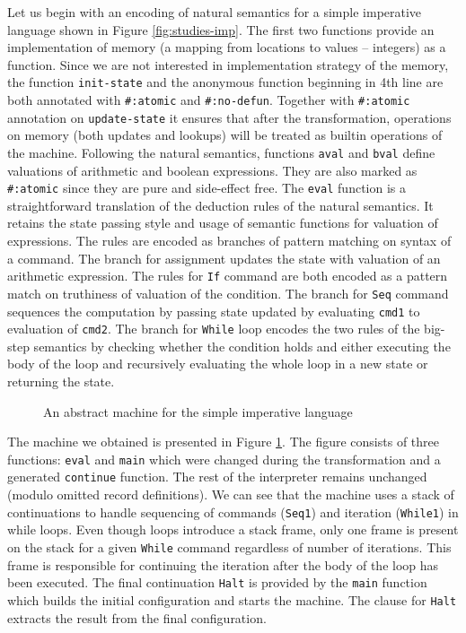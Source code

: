 Let us begin with an encoding of natural semantics for a simple imperative language shown in Figure \ref{fig:studies-imp}.
The first two functions provide an implementation of memory (a mapping from locations to values -- integers) as a function.
Since we are not interested in implementation strategy of the memory, the function \lstinline!init-state! and the anonymous function beginning in 4th line are both annotated with \lstinline!#:atomic! and \lstinline!#:no-defun!.
Together with \lstinline!#:atomic! annotation on \lstinline!update-state! it ensures that after the transformation, operations on memory (both updates and lookups) will be treated as builtin operations of the machine.
Following the natural semantics, functions \lstinline!aval! and \lstinline!bval! define valuations of arithmetic and boolean expressions.
They are also marked as \lstinline!#:atomic! since they are pure and side-effect free.
The \lstinline!eval! function is a straightforward translation of the deduction rules of the natural semantics.
It retains the state passing style and usage of semantic functions for valuation of expressions.
The rules are encoded as branches of pattern matching on syntax of a command.
The branch for assignment updates the state with valuation of an arithmetic expression.
The rules for \lstinline!If! command are both encoded as a pattern match on truthiness of valuation of the condition.
The branch for \lstinline!Seq! command sequences the computation by passing state updated by evaluating \lstinline!cmd1! to evaluation of \lstinline!cmd2!.
The branch for \lstinline!While! loop encodes the two rules of the big-step semantics by checking whether the condition holds and either executing the body of the loop and recursively evaluating the whole loop in a new state or returning the state.

\begin{figure}

\caption{An abstract machine for the simple imperative language}
\label{fig:studies-imp-machine}
\end{figure}

The machine we obtained is presented in Figure \ref{fig:studies-imp-machine}.
The figure consists of three functions: \lstinline!eval! and \lstinline!main! which were changed during the transformation and a generated \lstinline!continue! function.
The rest of the interpreter remains unchanged (modulo omitted record definitions).
We can see that the machine uses a stack of continuations to handle sequencing of commands (\lstinline!Seq1!) and iteration (\lstinline!While1!) in while loops.
Even though loops introduce a stack frame, only one frame is present on the stack for a given \lstinline!While! command regardless of number of iterations.
This frame is responsible for continuing the iteration after the body of the loop has been executed.
The final continuation \lstinline!Halt! is provided by the \lstinline!main! function which builds the initial configuration and starts the machine.
The clause for \lstinline!Halt! extracts the result from the final configuration.

